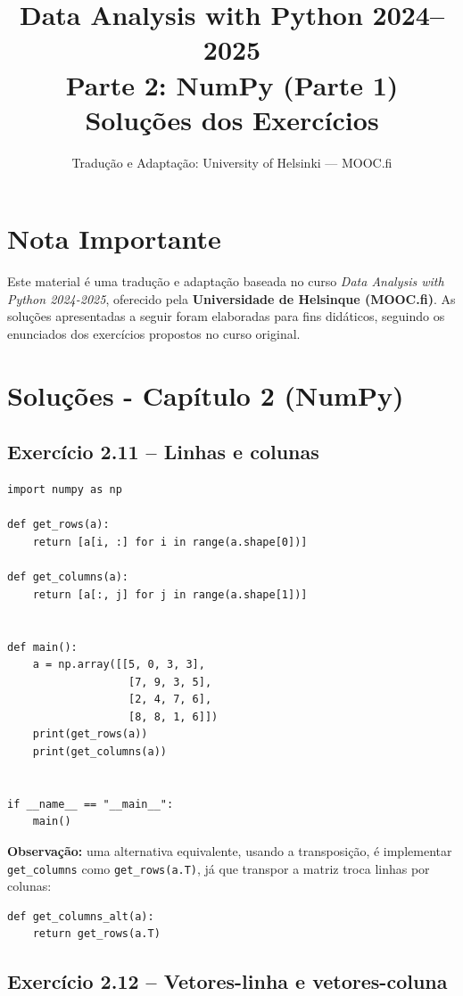 \documentclass[11pt,a4paper]{article}
\title{\textbf{Data Analysis with Python 2024--2025}\\Parte 2: NumPy (Parte 1)\\\large Soluções dos Exercícios}
\author{Tradução e Adaptação: University of Helsinki --- MOOC.fi}
\date{}
\begin{document}
\maketitle

\section*{Nota Importante}
Este material é uma tradução e adaptação baseada no curso \textit{Data Analysis with Python 2024-2025}, oferecido pela \textbf{Universidade de Helsinque (MOOC.fi)}. As soluções apresentadas a seguir foram elaboradas para fins didáticos, seguindo os enunciados dos exercícios propostos no curso original.

\tableofcontents
\newpage

\section{Soluções - Capítulo 2 (NumPy)}

\subsection*{Exercício 2.11 -- Linhas e colunas}

\begin{solucao}
\begin{lstlisting}
import numpy as np

def get_rows(a):
    return [a[i, :] for i in range(a.shape[0])]

def get_columns(a):
    return [a[:, j] for j in range(a.shape[1])]


def main():
    a = np.array([[5, 0, 3, 3],
                   [7, 9, 3, 5],
                   [2, 4, 7, 6],
                   [8, 8, 1, 6]])
    print(get_rows(a))
    print(get_columns(a))


if __name__ == "__main__":
    main()
\end{lstlisting}

\textbf{Observação:} uma alternativa equivalente, usando a transposição, é implementar \texttt{get\_columns} como \texttt{get\_rows(a.T)}, já que transpor a matriz troca linhas por colunas:

\begin{lstlisting}
def get_columns_alt(a):
    return get_rows(a.T)
\end{lstlisting}
\end{solucao}

\subsection*{Exercício 2.12 -- Vetores-linha e vetores-coluna}
\end{document}
